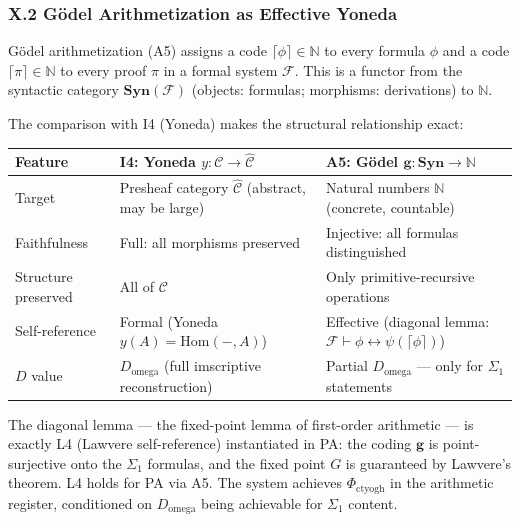 \documentclass[12pt,a4paper]{article}
\begin{document}
\subsubsection{X.2 G\"odel Arithmetization as Effective Yoneda}
G\"odel arithmetization (A5) assigns a code $\lceil \phi \rceil \in \mathbb{N}$ to every formula $\phi$ and a code $\lceil \pi \rceil \in \mathbb{N}$ to every proof $\pi$ in a formal system $\mathcal{F}$. This is a functor from the syntactic category $\mathbf{Syn}(\mathcal{F})$ (objects: formulas; morphisms: derivations) to $\mathbb{N}$.

The comparison with I4 (Yoneda) makes the structural relationship exact:
\begin{table}[htbp]
\centering
\small
{}
\begin{tabularx}{\textwidth}{>{\centering\arraybackslash}X >{\centering\arraybackslash}X >{\centering\arraybackslash}X}
\toprule
\rowcolor{gray!25}\textbf{Feature} & \textbf{I4: Yoneda $y: \mathcal{C} \to \hat{\mathcal{C}}$} & \textbf{A5: G\"odel $\mathbf{g}: \mathbf{Syn} \to \mathbb{N}$} \\
\midrule
\rowcolors{1}{white}{gray!10}
Target & Presheaf category $\hat{\mathcal{C}}$ (abstract, may be large) & Natural numbers $\mathbb{N}$ (concrete, countable) \\
Faithfulness & Full: all morphisms preserved & Injective: all formulas distinguished \\
Structure preserved & All of $\mathcal{C}$ & Only primitive-recursive operations \\
Self-reference & Formal (Yoneda $y(A) = \text{Hom}(-,A)$) & Effective (diagonal lemma: $\mathcal{F} \vdash \phi \leftrightarrow \psi(\lceil \phi \rceil)$) \\
$D$ value & $D_{\text{omega}}$ (full imscriptive reconstruction) & Partial $D_{\text{omega}}$ --- only for $\Sigma_1$ statements \\
\bottomrule
\end{tabularx}
\end{table}

The diagonal lemma --- the fixed-point lemma of first-order arithmetic --- is exactly L4 (Lawvere self-reference) instantiated in PA: the coding $\mathbf{g}$ is point-surjective onto the $\Sigma_1$ formulas, and the fixed point $G$ is guaranteed by Lawvere's theorem. L4 holds for PA via A5. The system achieves $\Phi_{\text{ctyogh}}$ in the arithmetic register, conditioned on $D_{\text{omega}}$ being achievable for $\Sigma_1$ content.
\end{document}
